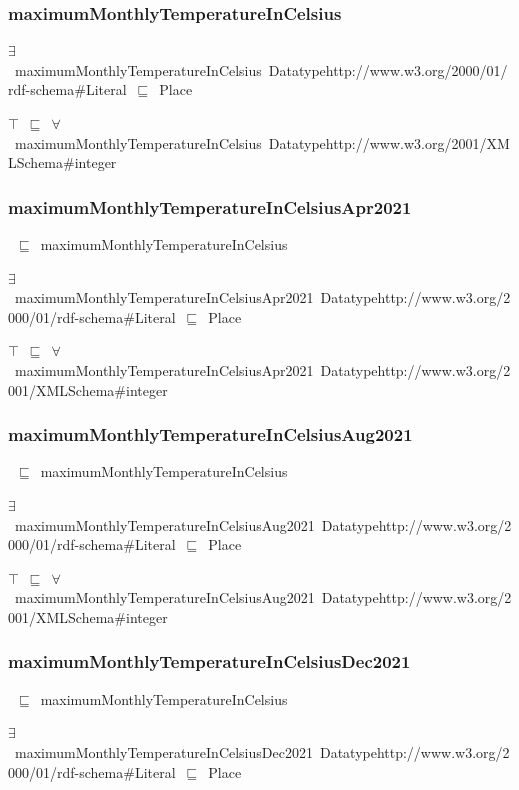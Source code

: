 \documentclass{article}
\begin{document}
\subsubsection*{maximumMonthlyTemperatureInCelsius}

\ensuremath{\exists}~maximumMonthlyTemperatureInCelsius~Datatypehttp://www.w3.org/2000/01/rdf-schema#Literal~\ensuremath{\sqsubseteq}~Place

\ensuremath{\top}~\ensuremath{\sqsubseteq}~\ensuremath{\forall}~maximumMonthlyTemperatureInCelsius~Datatypehttp://www.w3.org/2001/XMLSchema#integer

\subsubsection*{maximumMonthlyTemperatureInCelsiusApr2021}

~\ensuremath{\sqsubseteq}~maximumMonthlyTemperatureInCelsius

\ensuremath{\exists}~maximumMonthlyTemperatureInCelsiusApr2021~Datatypehttp://www.w3.org/2000/01/rdf-schema#Literal~\ensuremath{\sqsubseteq}~Place

\ensuremath{\top}~\ensuremath{\sqsubseteq}~\ensuremath{\forall}~maximumMonthlyTemperatureInCelsiusApr2021~Datatypehttp://www.w3.org/2001/XMLSchema#integer

\subsubsection*{maximumMonthlyTemperatureInCelsiusAug2021}

~\ensuremath{\sqsubseteq}~maximumMonthlyTemperatureInCelsius

\ensuremath{\exists}~maximumMonthlyTemperatureInCelsiusAug2021~Datatypehttp://www.w3.org/2000/01/rdf-schema#Literal~\ensuremath{\sqsubseteq}~Place

\ensuremath{\top}~\ensuremath{\sqsubseteq}~\ensuremath{\forall}~maximumMonthlyTemperatureInCelsiusAug2021~Datatypehttp://www.w3.org/2001/XMLSchema#integer

\subsubsection*{maximumMonthlyTemperatureInCelsiusDec2021}

~\ensuremath{\sqsubseteq}~maximumMonthlyTemperatureInCelsius

\ensuremath{\exists}~maximumMonthlyTemperatureInCelsiusDec2021~Datatypehttp://www.w3.org/2000/01/rdf-schema#Literal~\ensuremath{\sqsubseteq}~Place
\end{document}
